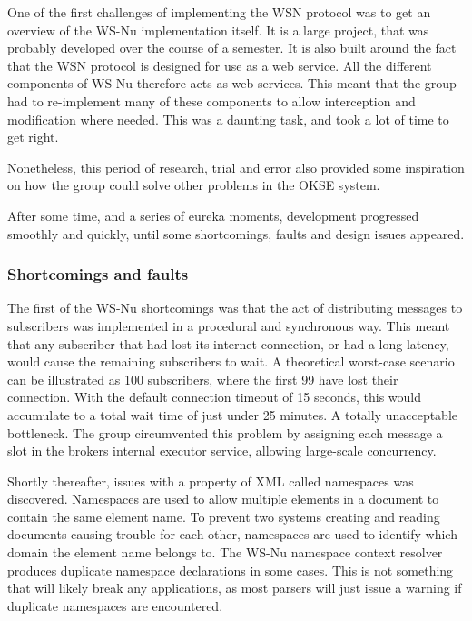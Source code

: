 One of the first challenges of implementing the WSN protocol was to get an overview of the WS-Nu implementation itself. It is a large project, that was probably developed over the course of a semester. It is also built around the fact that the WSN protocol is designed for use as a web service. All the different components of WS-Nu therefore acts as web services. This meant that the group had to re-implement many of these components to allow interception and modification where needed. This was a daunting task, and took a lot of time to get right.

Nonetheless, this period of research, trial and error also provided some inspiration on how the group could solve other problems in the OKSE system.

After some time, and a series of eureka moments, development progressed smoothly and quickly, until some shortcomings, faults and design issues appeared.

\subsubsection{Shortcomings and faults}
\label{subsec:evaluation-implementation-wsn-shortcomings_and_faults}

The first of the WS-Nu shortcomings was that the act of distributing messages to subscribers was implemented in a procedural and synchronous way. This meant that any subscriber that had lost its internet connection, or had a long latency, would cause the remaining subscribers to wait. A theoretical worst-case scenario can be illustrated as 100 subscribers, where the first 99 have lost their connection. With the default connection timeout of 15 seconds, this would accumulate to a total wait time of just under 25 minutes. A totally unacceptable bottleneck. The group circumvented this problem by assigning each message a slot in the brokers internal executor service, allowing large-scale concurrency.

Shortly thereafter, issues with a property of XML called namespaces was discovered. Namespaces are used to allow multiple elements in a document to contain the same element name. To prevent two systems creating and reading documents causing trouble for each other, namespaces are used to identify which domain the element name belongs to. The WS-Nu namespace context resolver produces duplicate namespace declarations in some cases. This is not something that will likely break any applications, as most parsers will just issue a warning if duplicate namespaces are encountered.

